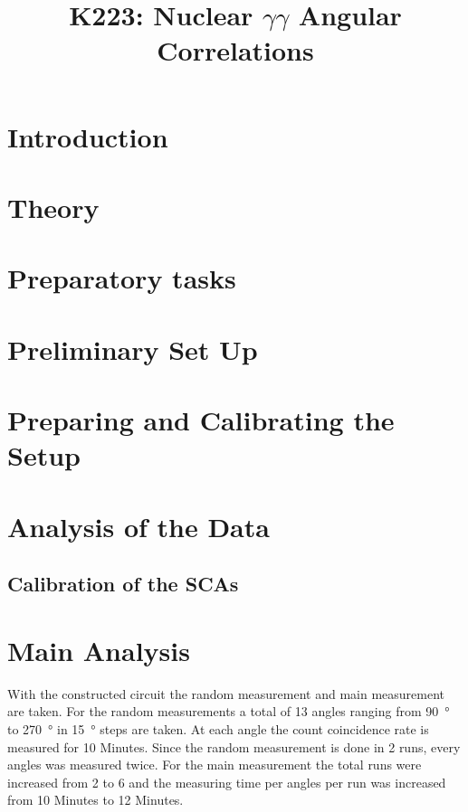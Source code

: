 \documentclass[sn-mathphys-num,icol]{sn-jnl}
\theoremstyle{thmstyleone}
\theoremstyle{thmstyletwo}
\theoremstyle{thmstylethree}
\begin{document}
\title{K223: Nuclear $\gamma\gamma$ Angular Correlations}
\author*[1]{ }
\author*[1]{ }
\maketitle
\section{Introduction}


\section{Theory}


\section{Preparatory tasks}

 
\section{Preliminary Set Up}


\section{Preparing and Calibrating the Setup}


\section{Analysis of the Data}
\subsection{Calibration of the SCAs}


\section{Main Analysis}
With the constructed circuit the random measurement and main measurement are taken. For the random measurements a total of 13 angles ranging from \SI{90}{\degree} to \SI{270}{\degree} in \SI{15}{\degree} steps are taken. At each angle the count coincidence rate is measured for 10 Minutes. Since the random measurement is done in 2 runs, every angles was measured twice. For the main measurement the total runs were increased from 2 to 6 and the measuring time per angles per run was increased from 10 Minutes to 12 Minutes.
\end{document}
